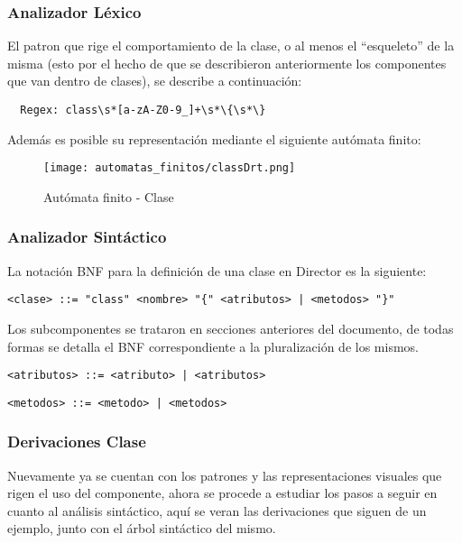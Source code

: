 \subsubsection{Analizador Léxico}
El patron que rige el comportamiento de la clase, o al menos el ``esqueleto''
de la misma (esto por el hecho de que se describieron anteriormente los
componentes que van dentro de clases), se describe a continuación:

\begin{lstlisting}
  Regex: class\s*[a-zA-Z0-9_]+\s*\{\s*\}
\end{lstlisting}

Además es posible su representación mediante el siguiente autómata finito:

\begin{figure}[H]
	\centering
	\texttt{[image: automatas\_finitos/classDrt.png]}
	\caption{Autómata finito - Clase}
	\label{fig:af_clase}
\end{figure}

\subsubsection{Analizador Sintáctico}
La notación BNF para la definición de una clase en Director es la siguiente:

\begin{lstlisting}[caption={BNF - Clase}, basicstyle=\footnotesize\ttfamily]
  <clase> ::= "class" <nombre> "{" <atributos> | <metodos> "}"
\end{lstlisting}

Los subcomponentes se trataron en secciones anteriores del documento, de todas
formas se detalla el BNF correspondiente a la pluralización de los mismos.

\begin{lstlisting}[basicstyle=\footnotesize\ttfamily]
  <atributos> ::= <atributo> | <atributos>
\end{lstlisting}

\begin{lstlisting}[basicstyle=\footnotesize\ttfamily]
  <metodos> ::= <metodo> | <metodos>
\end{lstlisting}


\subsubsection{Derivaciones Clase}

Nuevamente ya se cuentan con los  patrones y las representaciones visuales
que rigen
el uso del componente, ahora se procede a estudiar los pasos a seguir en cuanto al
análisis sintáctico, aquí se veran las derivaciones que siguen de un ejemplo,
junto con el árbol sintáctico del mismo.

